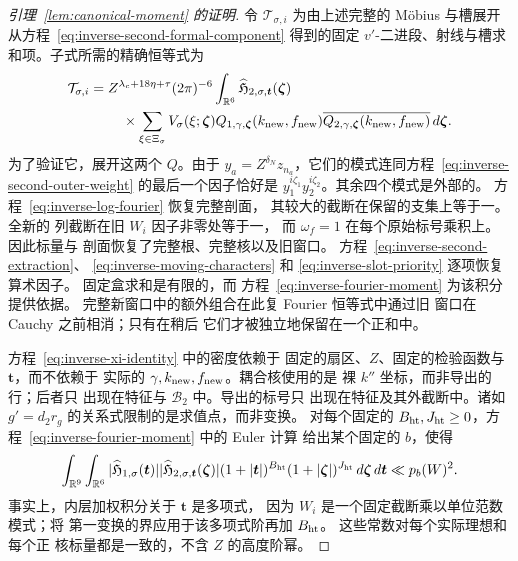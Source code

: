 \documentclass[11pt,a4paper]{article}
\numberwithin{equation}{section}
\numberwithin{figure}{section}
\theoremstyle{definition}
\theoremstyle{remark}
\begin{document}
\begin{proof}[引理~\ref{lem:canonical-moment} 的证明]
令 \(\mathcal T_{\sigma,i}\) 为由上述完整的 M\"obius 与槽展开从方程~\eqref{eq:inverse-second-formal-component} 得到的固定 \(v'\)-二进段、射线与槽求和项。子式所需的精确恒等式为
\begin{equation}\label{eq:inverse-xi-identity}
 \begin{split}
 \mathcal T_{\sigma,i}={}&Z^{\lambda_c+18\eta+\tau}(2\pi)^{-6}
 \int_{\mathbb R^6}\widehat{\mathfrak H}_{2,\sigma,\boldsymbol t}
       (\boldsymbol\zeta)\\
 &\quad\times\sum_{\xi\in\Xi_\sigma}V_\sigma(\xi;\boldsymbol\zeta)
 Q_{1,\gamma,\boldsymbol\zeta}(k_{\rm new},f_{\rm new})
 \overline{Q_{2,\gamma,\boldsymbol\zeta}(k_{\rm new},f_{\rm new})}
 \,d\boldsymbol\zeta.
 \end{split}
\end{equation}
为了验证它，展开这两个 \(Q\)。由于
\(y_a=Z^{\delta_N}z_{n_a}\)，它们的模式连同方程~\eqref{eq:inverse-second-outer-weight} 的最后一个因子恰好是
\(y_1^{i\zeta_1}y_2^{i\zeta_2}\)。其余四个模式是外部的。
方程~\eqref{eq:inverse-log-fourier} 恢复完整剖面，
其较大的截断在保留的支集上等于一。全新的
列截断在旧 \(W_i\) 因子非零处等于一，
而 \(\omega_f=1\) 在每个原始标号乘积上。因此标量与
剖面恢复了完整根、完整核以及旧窗口。
方程~\eqref{eq:inverse-second-extraction}、
\eqref{eq:inverse-moving-characters} 和
\eqref{eq:inverse-slot-priority} 逐项恢复算术因子。
固定盒求和是有限的，而
方程~\eqref{eq:inverse-fourier-moment} 为该积分提供依据。
完整新窗口中的额外组合在此复 Fourier 恒等式中通过旧
窗口在 Cauchy 之前相消；只有在稍后
它们才被独立地保留在一个正和中。

方程~\eqref{eq:inverse-xi-identity} 中的密度依赖于
固定的扇区、\(Z\)、固定的检验函数与 \(\boldsymbol t\)，而不依赖于
实际的 \(\gamma,k_{\rm new},f_{\rm new}\)。耦合核使用的是
裸 \(k''\) 坐标，而非导出的行；后者只
出现在特征与 \(\mathcal B_2\) 中。导出的标号只
出现在特征及其外截断中。诸如
\(g'=d_2r_g\) 的关系式限制的是求值点，而非变换。
对每个固定的 \(B_{\rm ht},J_{\rm ht}\ge0\)，方程~\eqref{eq:inverse-fourier-moment} 中的 Euler 计算
给出某个固定的 \(b\)，使得
\begin{equation}\label{eq:inverse-joint-fourier-moments}
 \int_{\mathbb R^9}\int_{\mathbb R^6}
 |\widehat{\mathfrak H}_{1,\sigma}(\boldsymbol t)|
 |\widehat{\mathfrak H}_{2,\sigma,\boldsymbol t}(\boldsymbol\zeta)|
 (1+|\boldsymbol t|)^{B_{\rm ht}}(1+|\boldsymbol\zeta|)^{J_{\rm ht}}
 \,d\boldsymbol\zeta\,d\boldsymbol t\ll p_b(W)^2.
\end{equation}
事实上，内层加权积分关于 \(\boldsymbol t\) 是多项式，
因为 \(W_i\) 是一个固定截断乘以单位范数模式；将
第一变换的界应用于该多项式阶再加 \(B_{\rm ht}\)。
这些常数对每个实际理想和每个正
核标量都是一致的，不含 \(Z\) 的高度阶幂。


\end{proof}
\end{document}
